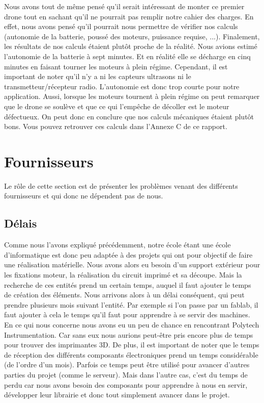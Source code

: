 \documentclass[a4paper,10pt]{report}
\begin{document}
	Nous avons tout de même pensé qu'il serait intéressant de monter ce 
premier drone tout en sachant qu'il ne pourrait pas remplir notre cahier des 
charges. En effet, nous avons pensé qu'il pourrait nous permettre de vérifier 
nos calculs (autonomie de la batterie, poussé des moteurs, puissance requise, 
...). Finalement, les résultats de nos calculs étaient plutôt proche de la 
réalité. Nous avions estimé l'autonomie de la batterie à sept minutes. Et en 
réalité elle se décharge en cinq minutes en faisant tourner les moteurs à plein 
régime. Cependant, il est important de noter qu'il n'y a ni les capteurs 
ultrasons ni le transmetteur/récepteur radio. L'autonomie est donc trop courte 
pour notre application. Aussi, lorsque les moteurs tournent à plein régime on 
peut remarquer que le drone se soulève et que ce qui l'empêche de décoller est 
le moteur défectueux. On peut donc en conclure que nos calculs mécaniques 
étaient plutôt bons. Vous pouvez retrouver ces calculs dans l'Annexe C de ce 
rapport.
    
    \section{Fournisseurs}
      Le rôle de cette section est de présenter les problèmes venant des 
différents fournisseurs et qui donc ne dépendent pas de nous.
      \subsection{Délais}
	Comme nous l'avons expliqué précédemment, notre école étant une école 
d'informatique est donc peu adaptée à des projets qui ont pour objectif de 
faire une réalisation matérielle. Nous avons alors eu besoin d'un support 
extérieur pour les fixations moteur, la réalisation du circuit imprimé et sa 
découpe. Mais la recherche de ces entités prend un certain temps, auquel il 
faut ajouter le temps de création des éléments. Nous arrivons alors à un délai 
conséquent, qui peut prendre plusieurs mois suivant l'entité. Par exemple si 
l'on passe par un fablab, il faut ajouter à cela le temps qu'il faut pour 
apprendre à se servir des machines. En ce qui nous concerne nous avons eu un 
peu de chance en rencontrant Polytech Instrumentation. Car sans eux nous 
aurions peut-être pris encore plus de temps pour trouver des imprimantes 3D. 
De plus, il est important de noter que le temps de réception des différents 
composants électroniques prend un temps considérable (de l'ordre d'un mois). 
Parfois ce temps peut être utilisé pour avancer d'autres parties du projet 
(comme le serveur). Mais dans l'autre cas, c'est du temps de perdu car nous 
avons besoin des composants pour apprendre à nous en servir, développer leur 
librairie et donc tout simplement avancer dans le projet.
\end{document}
